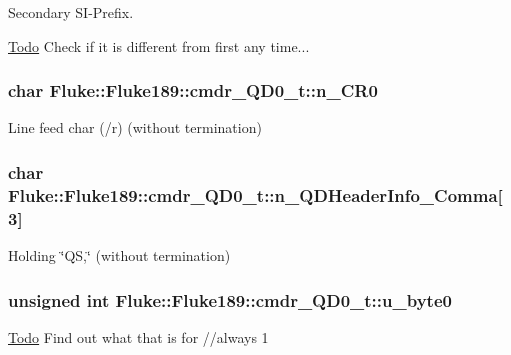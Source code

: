 Secondary SI-\/Prefix. \begin{Desc}
\item[\hyperlink{todo__todo000015}{Todo}]Check if it is different from first any time... \end{Desc}
\hypertarget{structFluke_1_1Fluke189_1_1cmdr__QD0__t_a052cc7ae576b3634f2eb8e1a4587c29e}{
\subsubsection[{n\_\-CR0}]{\setlength{\rightskip}{0pt plus 5cm}char {\bf Fluke::Fluke189::cmdr\_\-QD0\_\-t::n\_\-CR0}}}
\label{structFluke_1_1Fluke189_1_1cmdr__QD0__t_a052cc7ae576b3634f2eb8e1a4587c29e}
Line feed char (/r) (without termination) \hypertarget{structFluke_1_1Fluke189_1_1cmdr__QD0__t_adbec2e8d0ea53d60baa33f2bad91e272}{
\subsubsection[{n\_\-QDHeaderInfo\_\-Comma}]{\setlength{\rightskip}{0pt plus 5cm}char {\bf Fluke::Fluke189::cmdr\_\-QD0\_\-t::n\_\-QDHeaderInfo\_\-Comma}\mbox{[}3\mbox{]}}}
\label{structFluke_1_1Fluke189_1_1cmdr__QD0__t_adbec2e8d0ea53d60baa33f2bad91e272}
Holding \char`\"{}QS,\char`\"{} (without termination) \hypertarget{structFluke_1_1Fluke189_1_1cmdr__QD0__t_a8255c6d6c66768208d4a020146369013}{
\subsubsection[{u\_\-byte0}]{\setlength{\rightskip}{0pt plus 5cm}unsigned int {\bf Fluke::Fluke189::cmdr\_\-QD0\_\-t::u\_\-byte0}}}
\label{structFluke_1_1Fluke189_1_1cmdr__QD0__t_a8255c6d6c66768208d4a020146369013}
\begin{Desc}
\item[\hyperlink{todo__todo000016}{Todo}]Find out what that is for //always 1 \end{Desc}
